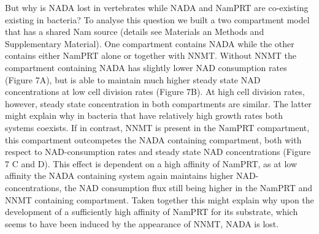 But why is NADA lost in vertebrates while NADA and NamPRT are co-existing existing in bacteria? To analyse this question we built a two compartment model that has a shared Nam source (details see Materials an Methods and Supplementary Material). One compartment contains NADA while the other contains either NamPRT alone or together with NNMT.  Without NNMT the compartment containing NADA has slightly lower NAD consumption rates (Figure 7A), but is able to maintain much higher steady state NAD concentrations at low cell division rates  (Figure 7B). At high cell division rates, however, steady state concentration in both compartments are similar. The latter might explain why in bacteria that have relatively high growth rates both systems coexists. 
If in contrast, NNMT is present in the NamPRT compartment, this compartment outcompetes the NADA containing compartment, both with respect to NAD-consumption rates and steady state NAD concentrations (Figure 7 C and D). This effect is dependent on a high affinity of NamPRT, as at low affinity the NADA containing system again maintains higher NAD-concentrations, the NAD consumption flux still being higher  in the NamPRT and NNMT containing compartment. Taken together this might explain why upon the development of a sufficiently high affinity of NamPRT for its substrate, which seems to have been induced by the appearance of NNMT, NADA is lost.

